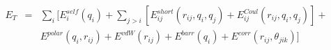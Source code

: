 \documentclass[12pt]{article}
\begin{document}
 \large
\begin{eqnarray*}
E_T & = & \sum_i [ E_i^{self} (q_i) + \sum_{j>i} [E_{ij}^{short} (r_{ij}, q_i, q_j) + E_{ij}^{Coul} (r_{ij}, q_i, q_j)] + \\
&& E^{polar} (q_i, r_{ij}) + E^{vdW} (r_{ij}) + E^{barr} (q_i) + E^{corr} (r_{ij}, \theta_{jik})] \\
\end{eqnarray*}                           
\end{document}

